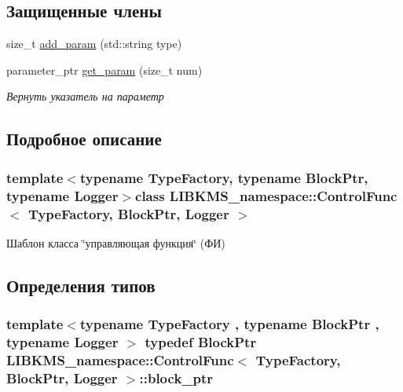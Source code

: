 \subsection*{Защищенные члены}
\begin{DoxyCompactItemize}
\item 
size\-\_\-t \hyperlink{classLIBKMS__namespace_1_1ControlFunc_aea0eac7590ff80e72d40151416f8d87b}{add\-\_\-param} (std\-::string type)
\item 
parameter\-\_\-ptr \hyperlink{classLIBKMS__namespace_1_1ControlFunc_ae24248b525cf699d35411325d1f32059}{get\-\_\-param} (size\-\_\-t num)
\begin{DoxyCompactList}\small\item\em Вернуть указатель на параметр \end{DoxyCompactList}\end{DoxyCompactItemize}


\subsection{Подробное описание}
\subsubsection*{template$<$typename Type\-Factory, typename Block\-Ptr, typename Logger$>$class L\-I\-B\-K\-M\-S\-\_\-namespace\-::\-Control\-Func$<$ Type\-Factory, Block\-Ptr, Logger $>$}

Шаблон класса \char`\"{}управляющая функция\char`\"{} (ФИ) 

\subsection{Определения типов}
\hypertarget{classLIBKMS__namespace_1_1ControlFunc_a4c0b78548d7ebcef58f9d5d2e2066c63}{
\subsubsection[{block\-\_\-ptr}]{\setlength{\rightskip}{0pt plus 5cm}template$<$typename Type\-Factory , typename Block\-Ptr , typename Logger $>$ typedef Block\-Ptr {\bf L\-I\-B\-K\-M\-S\-\_\-namespace\-::\-Control\-Func}$<$ {\bf Type\-Factory}, Block\-Ptr, Logger $>$\-::{\bf block\-\_\-ptr}}}\label{classLIBKMS__namespace_1_1ControlFunc_a4c0b78548d7ebcef58f9d5d2e2066c63}


